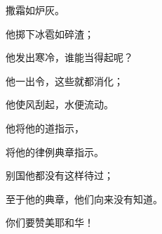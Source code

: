 {\par }{\Q 撒霜如炉灰。
\par }{\Q {}他掷下冰雹如碎渣；
\par }{\Q 他发出寒冷，谁能当得起呢？
\par }{\Q {}他一出令，这些就都消化；
\par }{\Q 他使风刮起，水便流动。
\par }{\BB \par }{\Q {}他将他的道指示{}，
\par }{\Q 将他的律例典章指示{}。
\par }{\Q {}别国他都没有这样待过；
\par }{\Q 至于他的典章，他们向来没有知道。
\par }{\BB \par }{\Q 你们要赞美耶和华！

}
